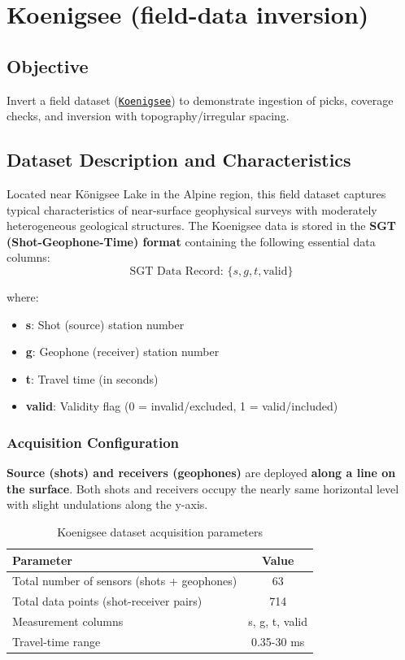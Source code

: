 \newpage
\section*{Koenigsee (field-data inversion)}
\subsection*{Objective}
Invert a field dataset (\href{https://github.com/gimli-org/example-data/blob/master/traveltime/koenigsee.sgt}{\texttt{Koenigsee}}) to demonstrate ingestion of picks, coverage checks, and inversion with topography/irregular spacing.

\subsection*{Dataset Description and Characteristics}
Located near K\"{o}nigsee Lake in the Alpine region, this field dataset captures typical characteristics of near-surface geophysical surveys with moderately heterogeneous geological structures. The Koenigsee data is stored in the \textbf{SGT (Shot-Geophone-Time) format} containing the following essential data columns:
\begin{equation}
\text{SGT Data Record: } \{s, g, t, \text{valid}\}
\end{equation}

where:
\begin{itemize}
    \item \textbf{s}: Shot (source) station number
    \item \textbf{g}: Geophone (receiver) station number
    \item \textbf{t}: Travel time (in seconds)
    \item \textbf{valid}: Validity flag (0 = invalid/excluded, 1 = valid/included)
\end{itemize}

\subsubsection*{Acquisition Configuration}
\textbf{Source (shots) and receivers (geophones)} are deployed \textbf{along a line on the surface}. Both shots and receivers occupy the nearly same horizontal level with slight undulations along the y-axis.
\begin{table}[H]
\centering
\caption{Koenigsee dataset acquisition parameters}
\label{tab:koenigsee_config}
\begin{tabular}{|l|c|}
\hline
\textbf{Parameter} & \textbf{Value} \\
\hline
Total number of sensors (shots + geophones) & 63 \\
Total data points (shot-receiver pairs) & 714 \\
Measurement columns & s, g, t, valid \\
Travel-time range & 0.35-30 ms \\
\hline
\end{tabular}
\end{table}

